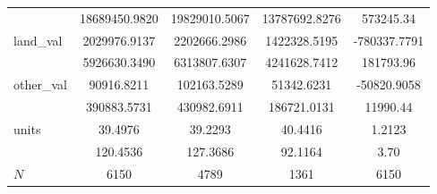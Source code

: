 {\begin{tabular}{l*{4}{c}}
            &18689450.9820 &19829010.5067 &13787692.8276 &   573245.34\\
land\_val    &2029976.9137 &2202666.2986 &1422328.5195 & -780337.7791\\
            &5926630.3490 &6313807.6307 &4241628.7412 &   181793.96\\
other\_val   & 90916.8211 &102163.5289 & 51342.6231 & -50820.9058\\
            &390883.5731 &430982.6911 &186721.0131 &    11990.44\\
units       &    39.4976 &    39.2293 &    40.4416 &      1.2123\\
            &   120.4536 &   127.3686 &    92.1164 &        3.70\\
\hline
\(N\)       &        6150&        4789&        1361&        6150\\
\hline\hline
\end{tabular}
}
